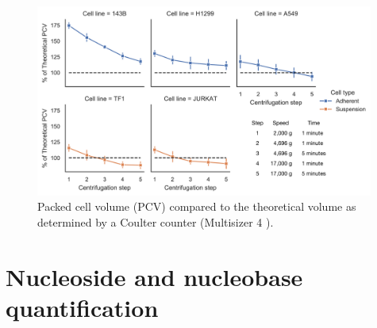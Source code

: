 \begin{figure}[ht]
    \centering
    \includegraphics[width=0.99\textwidth]{figures/chap2/app/CCvsPCV.pdf}
    \caption[Packed cell volume vs. Coulter counter]{
    Packed cell volume (PCV) compared to the theoretical volume as determined by a Coulter counter (Multisizer 4 ).
    }
    \label{fig:app_ch2:CCvsPCV}
\end{figure}











\chapter{Nucleoside and nucleobase quantification}

